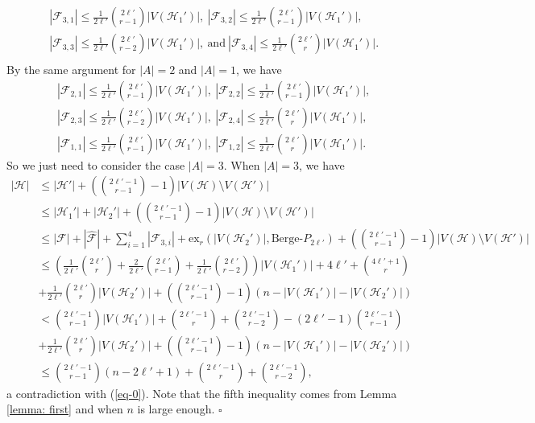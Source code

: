 \documentclass[12pt]{article}%
\newenvironment{proof}{{\noindent\it Proof.}}{\hfill $\square$\par}
\newcommand{\ber}{\text{Berge-}}
\newcommand{\mh}{\mathcal{H}}
\begin{document}
\begin{proof}
\begin{equation*}
\begin{aligned}
        &|\mathcal{F}_{3,1}|\leq \frac{1}{2\ell'}\binom{2\ell'}{r-1}|V(\mh_{1}')|, ~|\mathcal{F}_{3,2}|\leq \frac{1}{2\ell'}\binom{2\ell'}{r-1}|V(\mh_{1}')|,\\
        &|\mathcal{F}_{3,3}|\leq \frac{1}{2\ell'}\binom{2\ell'}{r-2}|V(\mh_{1}')|,~\text{and}~|\mathcal{F}_{3,4}|\leq \frac{1}{2\ell'}\binom{2\ell'}{r}|V(\mh_{1}')|.\\
    \end{aligned}
\end{equation*}By the same argument for $|A|=2$ and  $|A|=1$, we have
\begin{align*}
        &|\mathcal{F}_{2,1}|\leq \frac{1}{2\ell'}\binom{2\ell'}{r-1}|V(\mh_{1}')|, ~|\mathcal{F}_{2,2}|\leq \frac{1}{2\ell'}\binom{2\ell'}{r-1}|V(\mh_{1}')|,\\
        &|\mathcal{F}_{2,3}|\leq \frac{1}{2\ell'}\binom{2\ell'}{r-2}|V(\mh_{1}')|,~|\mathcal{F}_{2,4}|\leq \frac{1}{2\ell'}\binom{2\ell'}{r}|V(\mh_{1}')|,\\
        &|\mathcal{F}_{1,1}|\leq \frac{1}{2\ell'}\binom{2\ell'}{r-1}|V(\mh_{1}')|,~|\mathcal{F}_{1,2}|\leq \frac{1}{2\ell'}\binom{2\ell'}{r}|V(\mh_{1}')|.
    \end{align*}So we just need to consider the case $|A|=3$.
When $|A|=3$, we have
\begin{align*}
        |\mh|&\leq |\mh'|+\left(\binom{2\ell'-1}{r-1}-1\right)|V(\mh)\setminus V(\mh')|\\
        &\leq |\mh_{1}'|+|\mh_{2}'|+\left(\binom{2\ell'-1}{r-1}-1\right)|V(\mh)\setminus V(\mh')|\\
        &\leq |\mathcal{F}|+|\hat{\mathcal{F}}|+\sum_{i=1}^{4}|\mathcal{F}_{3,i}|+\mathrm{ex}_{r}(|V(\mh_{2}')|,\ber P_{2\ell'})+\left(\binom{2\ell'-1}{r-1}-1\right)|V(\mh)\setminus V(\mh')|\\
        &\leq  \left(\frac{1}{2\ell'}\binom{2\ell'}{r}+\frac{2}{2\ell'}\binom{2\ell'}{r-1}+\frac{1}{2\ell'}\binom{2\ell'}{r-2}\right)|V(\mh_{1}')|+4\ell'+\binom{4\ell'+1}{r}\\
        &+\frac{1}{2\ell'}\binom{2\ell'}{r}|V(\mh_{2}')|+\left(\binom{2\ell'-1}{r-1}-1\right)(n-|V(\mh_{1}')|-|V(\mh_{2}')|)\\
        &< \binom{2\ell'-1}{r-1}|V(\mh_{1}')|+\binom{2\ell'-1}{r}+\binom{2\ell'-1}{r-2}-(2\ell'-1)\binom{2\ell'-1}{r-1}\\
                &+\frac{1}{2\ell'}\binom{2\ell'}{r}|V(\mh_{2}')|+\left(\binom{2\ell'-1}{r-1}-1\right)(n-|V(\mh_{1}')|-|V(\mh_{2}')|)\\
        &\leq \binom{2\ell'-1}{r-1}(n-2\ell'+1)+\binom{2\ell'-1}{r}+\binom{2\ell'-1}{r-2},
    \end{align*}a contradiction with (\ref{eq-0}).
 Note that the fifth inequality comes from Lemma \ref{lemma: first} and when $n$ is large enough.
\end{proof}
\end{document}
